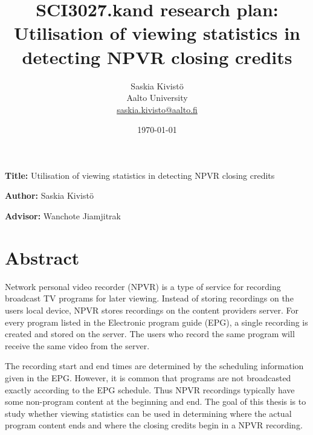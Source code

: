 \documentclass[12pt,a4paper,english,oneside]{article}
\begin{document}
\title{SCI3027.kand research plan:\\[5mm]
Utilisation of viewing statistics in detecting NPVR closing credits}

\author{Saskia Kivistö\\
Aalto University\\
\url{saskia.kivisto@aalto.fi}}

\date{\today}

\maketitle




\textbf{Title:} Utilisation of viewing statistics in detecting NPVR closing credits

\textbf{Author:} Saskia Kivistö

\textbf{Advisor:} Wanchote Jiamjitrak

\section{Abstract}

Network personal video recorder (NPVR) is a type of service for recording broadcast TV programs for later viewing. Instead of storing recordings on the users local device, NPVR stores recordings on the content providers server. For every program listed in the Electronic program guide (EPG), a single recording is created and stored on the server. The users who record the same program will receive the same video from the server.

The recording start and end times are determined by the scheduling information given in the EPG. However, it is common that programs are not broadcasted exactly according to the EPG schedule. Thus NPVR recordings typically have some non-program content at the beginning and end. The goal of this thesis is to study whether viewing statistics can be used in determining where the actual program content ends and where the closing credits begin in a NPVR recording.

\end{document}
